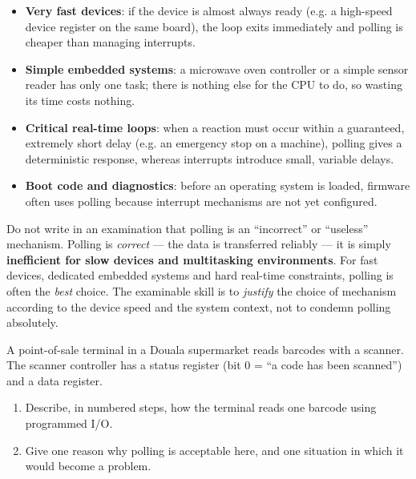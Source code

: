 \documentclass[11pt]{article}
\begin{document}
\begin{itemize}
\item \textbf{Very fast devices}: if the device is almost always ready (e.g. a high-speed device register on the same board), the loop exits immediately and polling is cheaper than managing interrupts.
\item \textbf{Simple embedded systems}: a microwave oven controller or a simple sensor reader has only one task; there is nothing else for the CPU to do, so wasting its time costs nothing.
\item \textbf{Critical real-time loops}: when a reaction must occur within a guaranteed, extremely short delay (e.g. an emergency stop on a machine), polling gives a deterministic response, whereas interrupts introduce small, variable delays.
\item \textbf{Boot code and diagnostics}: before an operating system is loaded, firmware often uses polling because interrupt mechanisms are not yet configured.
\end{itemize}

\begin{attention}
Do not write in an examination that polling is an ``incorrect'' or ``useless'' mechanism. Polling is \emph{correct} --- the data is transferred reliably --- it is simply \textbf{inefficient for slow devices and multitasking environments}. For fast devices, dedicated embedded systems and hard real-time constraints, polling is often the \emph{best} choice. The examinable skill is to \emph{justify} the choice of mechanism according to the device speed and the system context, not to condemn polling absolutely.
\end{attention}

\begin{exercice}
A point-of-sale terminal in a Douala supermarket reads barcodes with a scanner. The scanner controller has a status register (bit 0 = ``a code has been scanned'') and a data register.
\begin{enumerate}
\item Describe, in numbered steps, how the terminal reads one barcode using programmed I/O.
\item Give one reason why polling is acceptable here, and one situation in which it would become a problem.
\end{enumerate}
\end{exercice}
\end{document}
